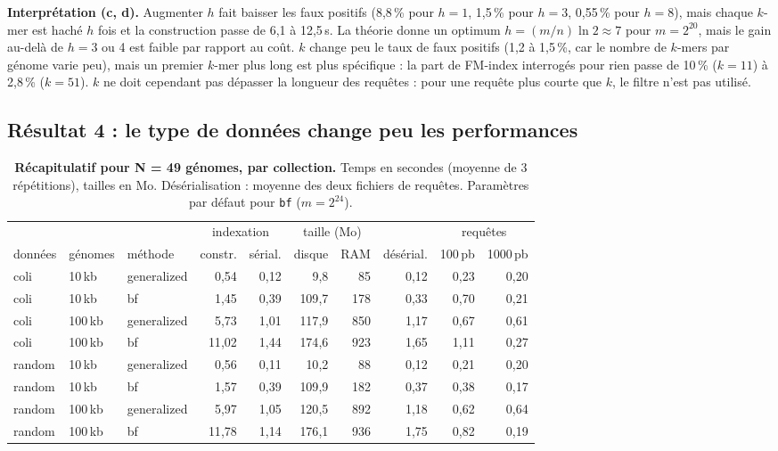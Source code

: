 \documentclass[11pt,a4paper]{article}
\begin{document}
\textbf{Interprétation (c, d).} Augmenter $h$ fait baisser les faux
positifs (8,8\,\% pour $h = 1$, 1,5\,\% pour $h = 3$, 0,55\,\% pour
$h = 8$), mais chaque $k$-mer est haché $h$ fois et la construction passe de
6,1 à 12,5\,s. La théorie donne un optimum $h = (m/n)\ln 2 \approx 7$ pour
$m = 2^{20}$, mais le gain au-delà de $h = 3$ ou 4 est faible par rapport au
coût. $k$ change peu le taux de faux positifs (1,2 à 1,5\,\%, car le
nombre de $k$-mers par génome varie peu), mais un premier $k$-mer plus long
est plus spécifique : la part de FM-index interrogés pour rien passe de
10\,\% ($k = 11$) à 2,8\,\% ($k = 51$). $k$ ne doit cependant pas dépasser
la longueur des requêtes : pour une requête plus courte que $k$, le filtre
n'est pas utilisé.

\subsection*{Résultat 4 : le type de données change peu les performances}

\begin{table}[H]
\centering
\small
\caption{\textbf{Récapitulatif pour N = 49 génomes, par collection.} Temps
en secondes (moyenne de 3 répétitions), tailles en Mo. Désérialisation :
moyenne des deux fichiers de requêtes. Paramètres par défaut pour
\texttt{bf} ($m = 2^{24}$).}
\label{tab:recap}
\begin{tabular}{lllrrrrrrr}
\toprule
& & & \multicolumn{2}{c}{indexation} & \multicolumn{2}{c}{taille (Mo)} & & \multicolumn{2}{c}{requêtes} \\
\cmidrule(lr){4-5} \cmidrule(lr){6-7} \cmidrule(lr){9-10}
données & génomes & méthode & constr. & sérial. & disque & RAM & désérial. & 100\,pb & 1000\,pb \\
\midrule
coli & 10\,kb & generalized & 0{,}54 & 0{,}12 & 9{,}8 & 85 & 0{,}12 & 0{,}23 & 0{,}20 \\
coli & 10\,kb & bf & 1{,}45 & 0{,}39 & 109{,}7 & 178 & 0{,}33 & 0{,}70 & 0{,}21 \\
coli & 100\,kb & generalized & 5{,}73 & 1{,}01 & 117{,}9 & 850 & 1{,}17 & 0{,}67 & 0{,}61 \\
coli & 100\,kb & bf & 11{,}02 & 1{,}44 & 174{,}6 & 923 & 1{,}65 & 1{,}11 & 0{,}27 \\
\midrule
random & 10\,kb & generalized & 0{,}56 & 0{,}11 & 10{,}2 & 88 & 0{,}12 & 0{,}21 & 0{,}20 \\
random & 10\,kb & bf & 1{,}57 & 0{,}39 & 109{,}9 & 182 & 0{,}37 & 0{,}38 & 0{,}17 \\
random & 100\,kb & generalized & 5{,}97 & 1{,}05 & 120{,}5 & 892 & 1{,}18 & 0{,}62 & 0{,}64 \\
random & 100\,kb & bf & 11{,}78 & 1{,}14 & 176{,}1 & 936 & 1{,}75 & 0{,}82 & 0{,}19 \\
\bottomrule
\end{tabular}
\end{table}
\end{document}
